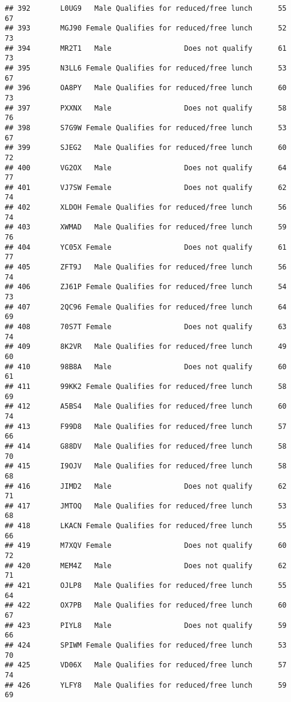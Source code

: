 \documentclass[
]{article}
\begin{document}
\begin{verbatim}
## 392       L0UG9   Male Qualifies for reduced/free lunch      55       67
## 393       MGJ90 Female Qualifies for reduced/free lunch      52       73
## 394       MR2T1   Male                 Does not qualify      61       73
## 395       N3LL6 Female Qualifies for reduced/free lunch      53       67
## 396       OA8PY   Male Qualifies for reduced/free lunch      60       73
## 397       PXXNX   Male                 Does not qualify      58       76
## 398       S7G9W Female Qualifies for reduced/free lunch      53       67
## 399       SJEG2   Male Qualifies for reduced/free lunch      60       72
## 400       VG2OX   Male                 Does not qualify      64       77
## 401       VJ7SW Female                 Does not qualify      62       74
## 402       XLDOH Female Qualifies for reduced/free lunch      56       74
## 403       XWMAD   Male Qualifies for reduced/free lunch      59       76
## 404       YC05X Female                 Does not qualify      61       77
## 405       ZFT9J   Male Qualifies for reduced/free lunch      56       74
## 406       ZJ61P Female Qualifies for reduced/free lunch      54       73
## 407       2QC96 Female Qualifies for reduced/free lunch      64       69
## 408       70S7T Female                 Does not qualify      63       74
## 409       8K2VR   Male Qualifies for reduced/free lunch      49       60
## 410       98B8A   Male                 Does not qualify      60       61
## 411       99KK2 Female Qualifies for reduced/free lunch      58       69
## 412       A5BS4   Male Qualifies for reduced/free lunch      60       74
## 413       F99D8   Male Qualifies for reduced/free lunch      57       66
## 414       G88DV   Male Qualifies for reduced/free lunch      58       70
## 415       I9OJV   Male Qualifies for reduced/free lunch      58       68
## 416       JIMD2   Male                 Does not qualify      62       71
## 417       JMTOQ   Male Qualifies for reduced/free lunch      53       68
## 418       LKACN Female Qualifies for reduced/free lunch      55       66
## 419       M7XQV Female                 Does not qualify      60       72
## 420       MEM4Z   Male                 Does not qualify      62       71
## 421       OJLP8   Male Qualifies for reduced/free lunch      55       64
## 422       OX7PB   Male Qualifies for reduced/free lunch      60       67
## 423       PIYL8   Male                 Does not qualify      59       66
## 424       SPIWM Female Qualifies for reduced/free lunch      53       70
## 425       VD06X   Male Qualifies for reduced/free lunch      57       74
## 426       YLFY8   Male Qualifies for reduced/free lunch      59       69

\end{verbatim}
\end{document}

